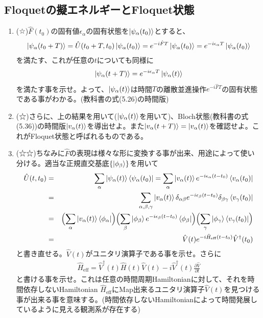 \documentclass[a4paper,12pt]{jsarticle}
\newcommand{\p}{\partial}
\renewcommand{\pdv}[2]{\frac{\p #1}{\p #2}}
\newcommand{\Biglrm}[1]{\Bigl( #1 \Bigr)}
\newcommand{\h}[1]{\hat{#1}}
\begin{document}
\subsection{Floquetの擬エネルギーとFloquet状態}
\begin{enumerate}
  \item (☆)$\h{F}(t_0)$の固有値$\epsilon_{\alpha}$の固有状態を$\ket{\psi_\alpha(t_0)}$とすると、
\begin{eqnarray}
  \ket{\psi_\alpha(t_0+T)} = \hat{U}(t_0+T,t_0)\ket{\psi_\alpha(t_0)} = e^{-i\hat{F} T}\ket{\psi_\alpha(t_0)} = e^{-i\epsilon_\alpha T}\ket{\psi_\alpha(t_0)}
\end{eqnarray}
を満たす、これが任意の$t$についても同様に$$\ket{\psi_\alpha(t+T)} = e^{-i\epsilon_\alpha T}\ket{\psi_\alpha(t)}$$を満たす事を示せ。よって、$\ket{\psi_\alpha(t)}$は時間$T$の離散並進操作$e^{-i\h{F}T}$の固有状態である事がわかる。(教科書の式(5.26)の時間版)
  \item (☆)さらに、上の結果を用いて($\ket{\psi_\alpha(t)}$を用いて)、Bloch状態(教科書の式(5.36))の時間版$\ket{v_\alpha(t)}$を導出せよ。また$\ket{v_\alpha(t+T)} = \ket{v_\alpha(t)}$を確認せよ。これがFloquet状態と呼ばれるものである。
  \item (☆☆)ちなみに$\h{F}$の表現は様々な形に変換する事が出来、用途によって使い分ける。適当な正規直交基底$\{\ket{\phi_\beta}\}$を用いて
\begin{eqnarray}
  \h{U}(t, t_0) &=& \sum_\alpha \ket{\psi_\alpha(t)}\bra{\psi_\alpha(t_0)} = \sum_\alpha \ket{v_\alpha(t)}e^{-i\epsilon_\alpha (t-t_0)}\bra{v_\alpha(t_0)}\\
  &=& \sum_{\alpha,\beta,\gamma} \ket{v_\alpha(t)}\delta_{\alpha\beta}e^{-i\epsilon_\beta (t-t_0)}\delta_{\beta\gamma}\bra{v_\gamma(t_0)}\\
  &=& \Biglrm{\sum_{\alpha} \ket{v_\alpha(t)}\bra{\phi_\alpha}} \Biglrm{\sum_\beta \ket{\phi_\beta}e^{-i\epsilon_\beta (t-t_0)}\bra{\phi_\beta}}\Biglrm{\sum_{\gamma}\ket{\phi_\gamma}\bra{v_\gamma(t_0)}}\\
  &=& \h{V}(t) e^{-i\h{H}_\mathrm{eff} (t-t_0)} \h{V}^\dagger(t_0)
\end{eqnarray}
と書き直せる。$\h{V}(t)$がユニタリ演算子である事を示せ。さらに
\begin{eqnarray}
  \h{H}_\mathrm{eff} = \h{V}^\dagger(t) \h{H}(t) \h{V}(t) - i \h{V}^\dagger(t) \pdv{\h{V}}{t}
\end{eqnarray}
と書ける事を示せ。これは任意の時間周期Hamiltonianに対して、それを時間依存しないHamiltonian $\h{H}_\mathrm{eff}$にMap出来るユニタリ演算子$\h{V}(t)$を見つける事が出来る事を意味する。(時間依存しないHamiltonianによって時間発展しているように見える観測系が存在する)
\end{enumerate}
\end{document}
